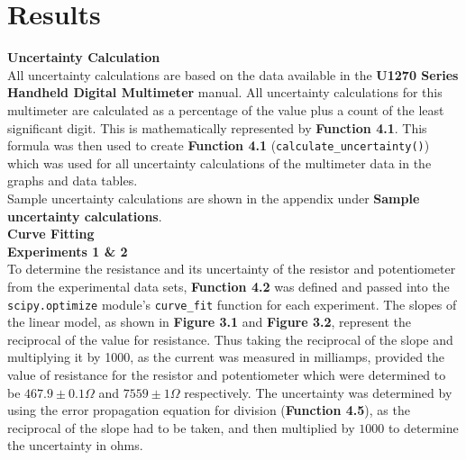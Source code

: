 \documentclass[
	letterpaper, %
	10pt, %
]{CSUniSchoolLabReport}
\begin{document}
\section{Results}
{\large\textbf{Uncertainty Calculation}}
{\vspace{5pt}}\\
All uncertainty calculations are based on the data available in the \textbf{U1270 Series Handheld Digital Multimeter} manual. All uncertainty
	calculations for this multimeter are calculated as a percentage of the value plus a count of the least significant digit. This is mathematically
	represented by \textbf{Function 4.1}. This formula was then used to create \textbf{Function 4.1} (\lstinline{calculate_uncertainty()}) which was
	used for all uncertainty calculations of the multimeter data in the graphs and data tables.\\
Sample uncertainty calculations are shown in the appendix under \textbf{Sample uncertainty calculations}.
{\vspace{10pt}}\\
{\large\textbf{Curve Fitting}}
{\vspace{5pt}}\\
\textbf{Experiments 1 \& 2}\\
To determine the resistance and its uncertainty of the resistor and potentiometer from the experimental data sets, \textbf{Function 4.2} was
	defined and passed into the \lstinline{scipy.optimize} module's \lstinline{curve_fit} function for each experiment. The slopes of the linear model, as shown in \textbf{Figure 3.1}
	and \textbf{Figure 3.2}, represent the reciprocal of the value for resistance. Thus taking the reciprocal of the slope and multiplying it by 1000, as
	the current was measured in milliamps, provided the value of resistance for the resistor and potentiometer which were determined to be
	$467.9 \pm 0.1 \Omega$ and $7559 \pm 1 \Omega$ respectively. The uncertainty was determined by using the error propagation equation for division (\textbf{Function 4.5}),
	as the reciprocal of the slope had to be taken, and then multiplied by $1000$ to determine the uncertainty in ohms.\\
\end{document}
